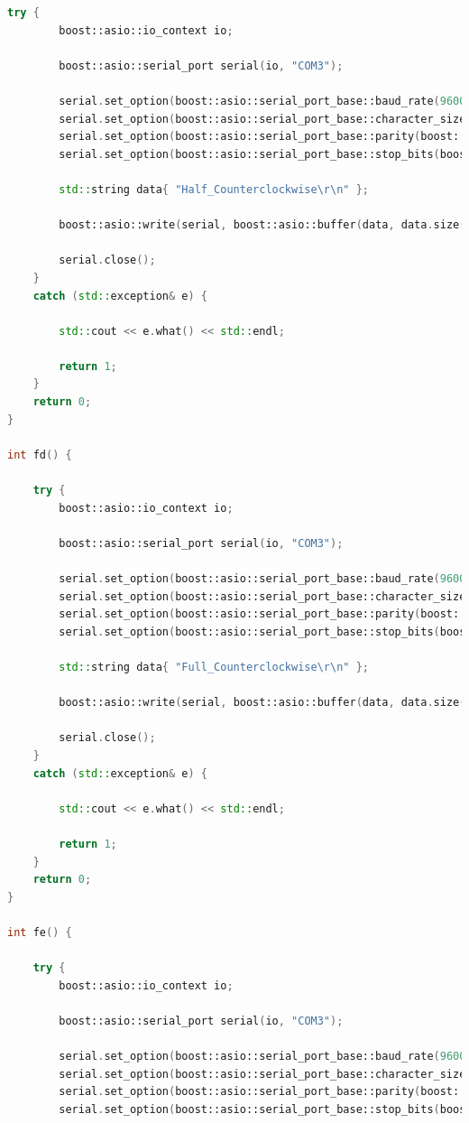 \documentclass[transmag]{IEEEtran}
\begin{document}
\begin{lstlisting}[language=C++, caption=PC controller program - Serial Communication - Main file]
    try {
        boost::asio::io_context io;

        boost::asio::serial_port serial(io, "COM3");

        serial.set_option(boost::asio::serial_port_base::baud_rate(9600));
        serial.set_option(boost::asio::serial_port_base::character_size(8));
        serial.set_option(boost::asio::serial_port_base::parity(boost::asio::serial_port_base::parity::none));
        serial.set_option(boost::asio::serial_port_base::stop_bits(boost::asio::serial_port_base::stop_bits::one));

        std::string data{ "Half_Counterclockwise\r\n" };

        boost::asio::write(serial, boost::asio::buffer(data, data.size()));

        serial.close();
    }
    catch (std::exception& e) {

        std::cout << e.what() << std::endl;

        return 1;
    }
    return 0;
}

int fd() {

    try {
        boost::asio::io_context io;

        boost::asio::serial_port serial(io, "COM3");

        serial.set_option(boost::asio::serial_port_base::baud_rate(9600));
        serial.set_option(boost::asio::serial_port_base::character_size(8));
        serial.set_option(boost::asio::serial_port_base::parity(boost::asio::serial_port_base::parity::none));
        serial.set_option(boost::asio::serial_port_base::stop_bits(boost::asio::serial_port_base::stop_bits::one));

        std::string data{ "Full_Counterclockwise\r\n" };

        boost::asio::write(serial, boost::asio::buffer(data, data.size()));

        serial.close();
    }
    catch (std::exception& e) {

        std::cout << e.what() << std::endl;

        return 1;
    }
    return 0;
}

int fe() {

    try {
        boost::asio::io_context io;

        boost::asio::serial_port serial(io, "COM3");

        serial.set_option(boost::asio::serial_port_base::baud_rate(9600));
        serial.set_option(boost::asio::serial_port_base::character_size(8));
        serial.set_option(boost::asio::serial_port_base::parity(boost::asio::serial_port_base::parity::none));
        serial.set_option(boost::asio::serial_port_base::stop_bits(boost::asio::serial_port_base::stop_bits::one));


\end{lstlisting}
\end{document}
